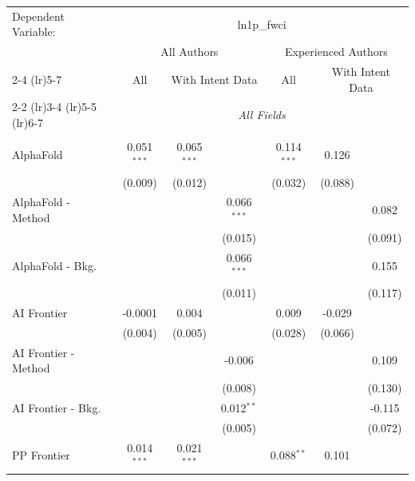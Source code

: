 \begingroup
\centering
\begin{tabular}{lcccccc}
   \tabularnewline \midrule \midrule
   Dependent Variable: & \multicolumn{6}{c}{ln1p\_fwci}\\
 & \multicolumn{3}{c}{All Authors} & \multicolumn{3}{c}{Experienced Authors} \\
\cmidrule(lr){2-4} \cmidrule(lr){5-7}
 & \multicolumn{1}{c}{All} & \multicolumn{2}{c}{With Intent Data} & \multicolumn{1}{c}{All} & \multicolumn{2}{c}{With Intent Data} \\
\cmidrule(lr){2-2} \cmidrule(lr){3-4} \cmidrule(lr){5-5} \cmidrule(lr){6-7}
 & \multicolumn{6}{c}{\textit{All Fields}} \\ \\
   AlphaFold            & 0.051$^{***}$ & 0.065$^{***}$ &               & 0.114$^{***}$ & 0.126   &   \\   
                        & (0.009)       & (0.012)       &               & (0.032)       & (0.088) &   \\   
   AlphaFold - Method   &               &               & 0.066$^{***}$ &               &         & 0.082\\   
                        &               &               & (0.015)       &               &         & (0.091)\\   
   AlphaFold - Bkg.     &               &               & 0.066$^{***}$ &               &         & 0.155\\   
                        &               &               & (0.011)       &               &         & (0.117)\\   
   AI Frontier          & -0.0001       & 0.004         &               & 0.009         & -0.029  &   \\   
                        & (0.004)       & (0.005)       &               & (0.028)       & (0.066) &   \\   
   AI Frontier - Method &               &               & -0.006        &               &         & 0.109\\   
                        &               &               & (0.008)       &               &         & (0.130)\\   
   AI Frontier - Bkg.   &               &               & 0.012$^{**}$  &               &         & -0.115\\   
                        &               &               & (0.005)       &               &         & (0.072)\\   
   PP Frontier          & 0.014$^{***}$ & 0.021$^{***}$ &               & 0.088$^{**}$  & 0.101   &   \\   

\end{tabular}
